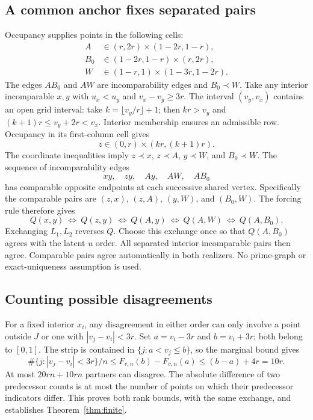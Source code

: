 \documentclass[11pt]{article}
\theoremstyle{remark}
\begin{document}
\subsection{A common anchor fixes separated pairs}
Occupancy supplies points in the following cells:
\begin{align*}
 A&\in(r,2r)\times(1-2r,1-r),\\
 B_0&\in(1-2r,1-r)\times(r,2r),\\
 W&\in(1-r,1)\times(1-3r,1-2r).
\end{align*}
The edges $AB_0$ and $AW$ are incomparability edges and $B_0\prec W$.
Take any interior incomparable $x,y$ with
$u_x<u_y$ and $v_x-v_y\ge3r$.
The interval $(v_y,v_x)$ contains an open grid interval: take
$k=\lfloor v_y/r\rfloor+1$; then $kr>v_y$ and
$(k+1)r\le v_y+2r<v_x$. Interior membership ensures an admissible
row. Occupancy in its first-column cell gives
\[
 z\in(0,r)\times(kr,(k+1)r).
\]
The coordinate inequalities imply
$z\prec x$, $z\prec A$, $y\prec W$, and $B_0\prec W$.
The sequence of incomparability edges
\[
 xy,\quad zy,\quad Ay,\quad AW,\quad AB_0
\]
has comparable opposite endpoints at each successive shared vertex.
Specifically the comparable pairs are $(z,x)$, $(z,A)$, $(y,W)$,
and $(B_0,W)$. The forcing rule therefore gives
\[
 Q(x,y)\ \Longleftrightarrow\ Q(z,y)
 \ \Longleftrightarrow\ Q(A,y)
 \ \Longleftrightarrow\ Q(A,W)
 \ \Longleftrightarrow\ Q(A,B_0).
\]
Exchanging $L_1,L_2$ reverses $Q$. Choose this exchange once so that
$Q(A,B_0)$ agrees with the latent $u$ order. All separated interior
incomparable pairs then agree. Comparable pairs agree automatically
in both realizers. No prime-graph or exact-uniqueness assumption is used.

\subsection{Counting possible disagreements}
For a fixed interior $x_i$, any disagreement in either order can only
involve a point outside $J$ or one with $|v_j-v_i|<3r$.
Set $a=v_i-3r$ and $b=v_i+3r$; both belong to $[0,1]$.
The strip is contained in $\{j:a<v_j\le b\}$, so the marginal bound gives
\[
 \#\{j:|v_j-v_i|<3r\}/n
 \le F_{v,n}(b)-F_{v,n}(a)\le(b-a)+4r=10r.
\]
At most $20rn+10rn$ partners can disagree. The absolute difference
of two predecessor counts is at most the number of points on which
their predecessor indicators differ. This proves both rank bounds,
with the same exchange, and establishes Theorem~\ref{thm:finite}.
\end{document}
